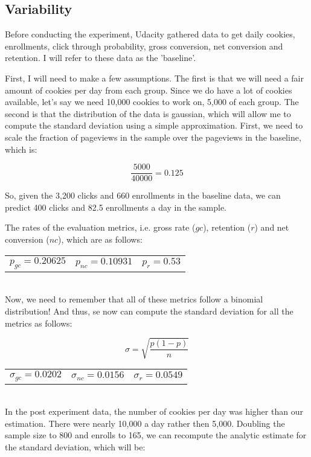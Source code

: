 \documentclass[11pt]{article}
\begin{document}
	\subsection{Variability}
	
		Before conducting the experiment, Udacity gathered data to get daily cookies, enrollments, click through probability, gross conversion, net conversion and retention.
		I will refer to these data as the 'baseline'.
		
		First, I will need to make a few assumptions.
		The first is that we will need a fair amount of cookies per day from each group.
		Since we do have a lot of cookies available, let's say we need 10,000 cookies to work on, 5,000 of each group.
		The second is that the distribution of the data is gaussian, which will allow me to compute the standard deviation using a simple approximation.
		First, we need to scale the fraction of pageviews in the sample over the pageviews in the baseline, which is:
		
		\begin{displaymath}
			\frac{5000}{40000} = 0.125
		\end{displaymath}
		
		So, given the 3,200 clicks and 660 enrollments in the baseline data, we can predict 400 clicks and 82.5 enrollments a day in the sample.
	
		The rates of the evaluation metrics, i.e. gross rate ($gc$), retention ($r$) and net conversion ($nc$), which are as follows: \\
		\begin{tabular}{ccc}
			$p_{gc} = 0.20625$ & $p_{nc} = 0.10931$ & $p_{r} = 0.53$ \\
		\end{tabular}
		
		~\\
		Now, we need to remember that all of these metrics follow a binomial distribution!	
		And thus, se now can compute the standard deviation for all the metrics as follows:
		
		\begin{equation}
			\sigma = \sqrt{\frac{p(1-p)}{n}}
		\end{equation}
		
		\begin{tabular}{ccc}
			$\sigma_{gc} = 0.0202$ & $\sigma_{nc} = 0.0156$ & $\sigma_{r} = 0.0549$ \\
		\end{tabular}
		
		~\\
		In the post experiment data, the number of cookies per day was higher than our estimation.
		There were nearly 10,000 a day rather then 5,000.
		Doubling the sample size to 800 and enrolls to 165, we can recompute the analytic estimate for the standard deviation, which will be:
	
\end{document}
